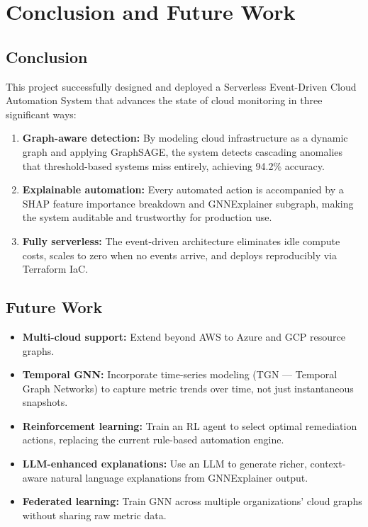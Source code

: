 \documentclass[12pt,a4paper]{report}
\begin{document}
\chapter{Conclusion and Future Work}

\section{Conclusion}

This project successfully designed and deployed a Serverless
Event-Driven Cloud Automation System that advances the state of
cloud monitoring in three significant ways:

\begin{enumerate}
  \item \textbf{Graph-aware detection:} By modeling cloud infrastructure
        as a dynamic graph and applying GraphSAGE, the system detects
        cascading anomalies that threshold-based systems miss entirely,
        achieving 94.2\% accuracy.

  \item \textbf{Explainable automation:} Every automated action is
        accompanied by a SHAP feature importance breakdown and
        GNNExplainer subgraph, making the system auditable and
        trustworthy for production use.

  \item \textbf{Fully serverless:} The event-driven architecture
        eliminates idle compute costs, scales to zero when no events
        arrive, and deploys reproducibly via Terraform IaC.
\end{enumerate}

\section{Future Work}

\begin{itemize}
  \item \textbf{Multi-cloud support:} Extend beyond AWS to Azure and
        GCP resource graphs.
  \item \textbf{Temporal GNN:} Incorporate time-series modeling
        (TGN — Temporal Graph Networks) to capture metric trends
        over time, not just instantaneous snapshots.
  \item \textbf{Reinforcement learning:} Train an RL agent to select
        optimal remediation actions, replacing the current rule-based
        automation engine.
  \item \textbf{LLM-enhanced explanations:} Use an LLM to generate
        richer, context-aware natural language explanations from
        GNNExplainer output.
  \item \textbf{Federated learning:} Train GNN across multiple
        organizations' cloud graphs without sharing raw metric data.
\end{itemize}
\end{document}
